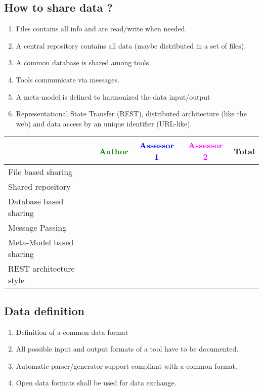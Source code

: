 \subsection{How to share data ?}
\begin{enumerate}
\item Files contains all info and are read/write when needed.
\item A central repository contains all data (maybe distributed in a
  set of files).
\item A common database is shared among tools
\item Tools communicate via messages.
\item A meta-model is defined to harmonized the data input/output
\item Representational State Transfer (REST), distributed architecture (like the web) and data access by an
  unique identifier (URL-like).
\end{enumerate}
\begin{tabular}{|l | c | c | c | c|} \hline
  & \textcolor{green}{Author} & \textcolor{blue}{Assessor 1} &  \textcolor{magenta}{Assessor 2} & Total \\
  \hline File based sharing &
  &                 &                  &\\
  \hline Shared repository &
  &                 &                  &\\
  \hline Database based sharing&
  &                 &                  &\\
  \hline Message Passing&
  &                 &                  &\\
  \hline Meta-Model based sharing &
  &                 &                  &\\
  \hline REST architecture style &
  &                 &                  &\\
  \hline
\end{tabular}


\subsection{Data definition}
\begin{enumerate}
\item Definition of a common data format
\item All possible input and output formats of a tool have to be
  documented.
\item Automatic parser/generator support compliant with a common format.
\item Open data formats shall be used for data exchange.
 
\end{enumerate}

